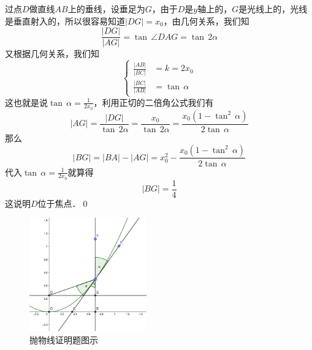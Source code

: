 过点$D$做直线$AB$上的垂线，设垂足为$G$，由于$D$是$y$轴上的，$G$是光线上的，光线是垂直射入的，所以很容易知道$\lvert DG \rvert = x_0$，由几何关系，我们知
\begin{equation}
    \frac{\lvert DG \rvert}{\lvert AG \rvert} = \tan \, \angle DAG = \tan \, 2\alpha
\end{equation}
又根据几何关系，我们知
\begin{equation}
    \begin{cases}
        \displaystyle\frac{\lvert AB \rvert}{\lvert BC \rvert} &= k = 2x_0 \\
        \displaystyle\frac{\lvert BC \rvert}{\lvert AB \rvert} &= \tan \, \alpha
    \end{cases}
\end{equation}
这也就是说$\tan \, \alpha = \displaystyle\frac{1}{2x_0}$，利用正切的二倍角公式我们有
\begin{equation}
    \lvert AG \rvert = \frac{\lvert DG \rvert}{\tan \, 2 \alpha} = \frac{x_0}{\tan \, 2 \alpha} = \frac{x_0(1-\tan^2 \, \alpha)}{2 \tan \, \alpha}
\end{equation}
那么
\begin{equation}
    \lvert BG \rvert = \lvert BA \rvert - \lvert AG \rvert = x_0^2 - \frac{x_0(1-\tan^2 \, \alpha)}{2 \tan \, \alpha}
\end{equation}
代入$\tan \, \alpha = \displaystyle\frac{1}{2x_0}$就算得
\begin{equation}
    \lvert BG \rvert = \frac{1}{4}
\end{equation}
这说明$D$位于焦点．\qed\bigskip

\begin{figure}[H]
    \centering
    \includegraphics[width=0.45\textwidth]{chapter3/light.png}
    \caption{抛物线证明题图示}
\end{figure}